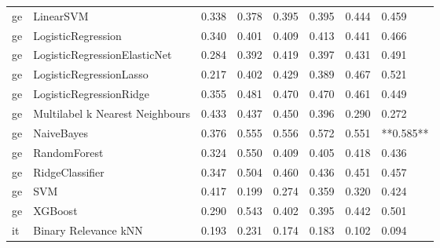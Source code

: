 \begin{tabular}{llllllll}
      ge &                       LinearSVM & 0.338 &                     0.378 &                 0.395 &                  0.395 &                                   0.444 &     0.459 \\
      ge &              LogisticRegression & 0.340 &                     0.401 &                 0.409 &                  0.413 &                                   0.441 &     0.466 \\
      ge &    LogisticRegressionElasticNet & 0.284 &                     0.392 &                 0.419 &                  0.397 &                                   0.431 &     0.491 \\
      ge &         LogisticRegressionLasso & 0.217 &                     0.402 &                 0.429 &                  0.389 &                                   0.467 &     0.521 \\
      ge &         LogisticRegressionRidge & 0.355 &                     0.481 &                 0.470 &                  0.470 &                                   0.461 &     0.449 \\
      ge & Multilabel k Nearest Neighbours & 0.433 &                     0.437 &                 0.450 &                  0.396 &                                   0.290 &     0.272 \\
      ge &                      NaiveBayes & 0.376 &                     0.555 &                 0.556 &                  0.572 &                                   0.551 & **0.585** \\
      ge &                    RandomForest & 0.324 &                     0.550 &                 0.409 &                  0.405 &                                   0.418 &     0.436 \\
      ge &                 RidgeClassifier & 0.347 &                     0.504 &                 0.460 &                  0.436 &                                   0.451 &     0.457 \\
      ge &                             SVM & 0.417 &                     0.199 &                 0.274 &                  0.359 &                                   0.320 &     0.424 \\
      ge &                         XGBoost & 0.290 &                     0.543 &                 0.402 &                  0.395 &                                   0.442 &     0.501 \\
      it &            Binary Relevance kNN & 0.193 &                     0.231 &                 0.174 &                  0.183 &                                   0.102 &     0.094 \\

\end{tabular}
